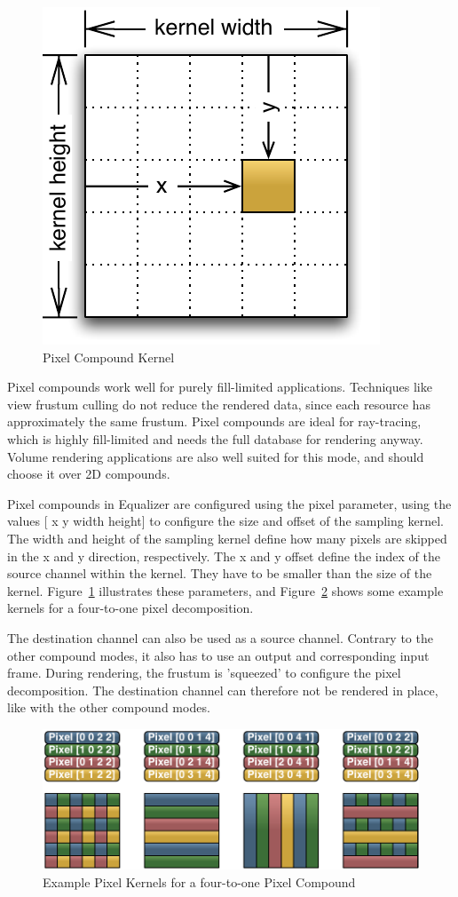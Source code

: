 \documentclass[10pt,a4]{scrartcl}
\newcommand{\fig}[1]{Figure~\ref{#1}}
\begin{document}
\begin{figure}
  \includegraphics[width=.382\textwidth]{images/pixelKernel.pdf}
  {\caption{\label{fPixelKernel}\small Pixel Compound Kernel}}
\end{figure}
Pixel compounds work well for purely fill-limited applications. Techniques like
view frustum culling do not reduce the rendered data, since each resource has
approximately the same frustum. Pixel compounds are ideal for ray-tracing, which
is highly fill-limited and needs the full database for rendering anyway. Volume
rendering applications are also well suited for this mode, and should choose it
over 2D compounds.

Pixel compounds in Equalizer are configured using the \textsf{pixel}
parameter, using the values \textsf{[ x y width height]}  to configure
the size and offset of the sampling kernel. The width and height of the
sampling kernel define how many pixels are skipped in the x and y
direction, respectively. The x and y offset define the index of the
source channel within the kernel. They have to be smaller than the size
of the kernel. \fig{fPixelKernel} illustrates these parameters, and
\fig{fPixelKernels} shows some example kernels for a four-to-one pixel decomposition.

The destination channel can also be used as a source channel. Contrary
to the other compound modes, it also has to use an output and
corresponding input frame. During rendering, the frustum is 'squeezed'
to configure the pixel decomposition. The destination channel can
therefore not be rendered in place, like with the other compound modes.
\begin{figure}[ht!]\center
  \includegraphics[width=.9\textwidth]{images/pixelKernels.pdf}
  {\caption{\label{fPixelKernels}Example Pixel Kernels for a
      four-to-one Pixel Compound}}
\end{figure}
\end{document}
